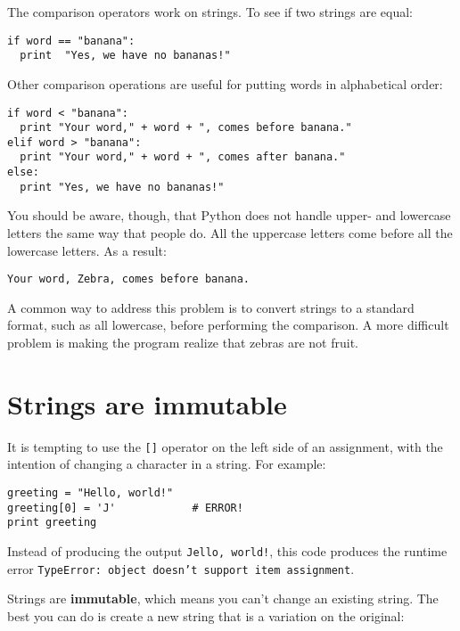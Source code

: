 The comparison operators work on
strings.  To see if two strings are equal:

\beforeverb
\begin{verbatim}
if word == "banana":
  print  "Yes, we have no bananas!"
\end{verbatim}
\afterverb
%
\pagebreak

Other comparison operations are useful for putting words in alphabetical
order:

\beforeverb
\begin{verbatim}
if word < "banana":
  print "Your word," + word + ", comes before banana."
elif word > "banana":
  print "Your word," + word + ", comes after banana."
else:
  print "Yes, we have no bananas!"
\end{verbatim}
\afterverb
%
You should be aware, though, that Python does not handle upper-
and lowercase letters the same way that people do.  All the uppercase
letters come before all the lowercase letters.  As a result:

\beforeverb
\begin{verbatim}
Your word, Zebra, comes before banana.
\end{verbatim}
\afterverb
%
A common way to address this problem is to convert strings to a standard
format, such as all lowercase, before performing the comparison.  A more
difficult problem is making the program realize that zebras are not fruit.


\section{Strings are immutable}

It is tempting to use the {\tt []} operator on the left side of an
assignment, with the intention of changing a character in a string.
For example:

\beforeverb
\begin{verbatim}
greeting = "Hello, world!"
greeting[0] = 'J'            # ERROR!
print greeting
\end{verbatim}
\afterverb
%
Instead of producing the output {\tt Jello, world!}, this code
produces the runtime error {\tt TypeError: object doesn't support item
assignment}.


Strings are {\bf immutable}, which means you can't change an
existing string.  The best you can do is create a new string
that is a variation on the original:

